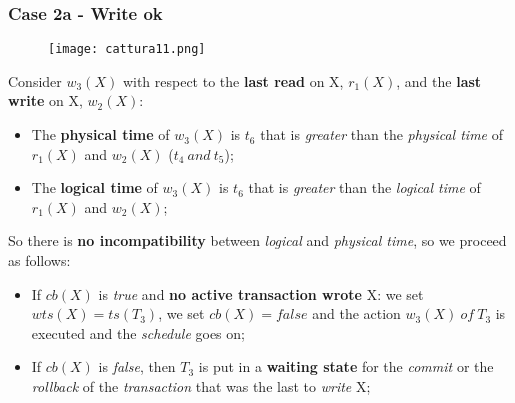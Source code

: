 \documentclass{article}
\begin{document}
\subsubsection {Case 2a - Write ok}
\begin{figure}[H]
  \centering
  \texttt{[image: cattura11.png]}
\end{figure}
Consider $w_3(X)$ with respect to the \textbf{last read} on X, $r_1(X)$, and the \textbf{last write} on X, $w_2(X)$:
\begin{itemize}
\item The \textbf{physical time} of $w_3(X)$ is $t_6$ that is \emph{greater} than the \emph{physical time} of $r_1(X)$ and $w_2(X)$ ($t_4\ and\ t_5$);
\item The \textbf{logical time} of $w_3(X)$ is $t_6$ that is \emph{greater} than the \emph{logical time} of $r_1(X)$ and $w_2(X)$;
\end{itemize}
So there is \textbf{no incompatibility} between \emph{logical} and \emph{physical time}, so we proceed as follows:
\begin{itemize}
\item If $cb(X)$ is \emph{true} and \textbf{no active transaction wrote} X: we set $wts(X) = ts(T_3)$, we set $cb(X) = false$ and the action $w_3(X)\ of\ T_3$ is executed and the \emph{schedule} goes on;
\item If $cb(X)$ is \emph{false}, then $T_3$ is put in a \textbf{waiting state} for the \emph{commit} or the \emph{rollback} of the \emph{transaction} that was the last to \emph{write} X;
\end{itemize}
\end{document}
